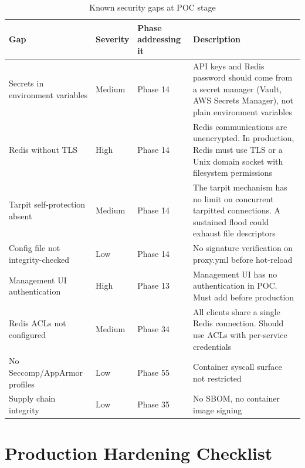 \begin{fullwidth}
\begin{table}[h]
\caption{Known security gaps at POC stage}
\label{tab:security-gaps}
\begin{tabular}{@{}lllp{5cm}@{}}
\toprule
\textbf{Gap} & \textbf{Severity} & \textbf{Phase addressing it} & \textbf{Description} \\
\midrule
Secrets in environment variables & Medium & Phase 14 & API keys and Redis password should come from a secret manager (Vault, AWS Secrets Manager), not plain environment variables \\
Redis without TLS & High & Phase 14 & Redis communications are unencrypted. In production, Redis must use TLS or a Unix domain socket with filesystem permissions \\
Tarpit self-protection absent & Medium & Phase 14 & The tarpit mechanism has no limit on concurrent tarpitted connections. A sustained flood could exhaust file descriptors \\
Config file not integrity-checked & Low & Phase 14 & No signature verification on proxy.yml before hot-reload \\
Management UI authentication & High & Phase 13 & Management UI has no authentication in POC. Must add before production \\
Redis ACLs not configured & Medium & Phase 34 & All clients share a single Redis connection. Should use ACLs with per-service credentials \\
No Seccomp/AppArmor profiles & Low & Phase 55 & Container syscall surface not restricted \\
Supply chain integrity & Low & Phase 35 & No SBOM, no container image signing \\
\bottomrule
\end{tabular}
\end{table}
\end{fullwidth}

\section{Production Hardening Checklist}

